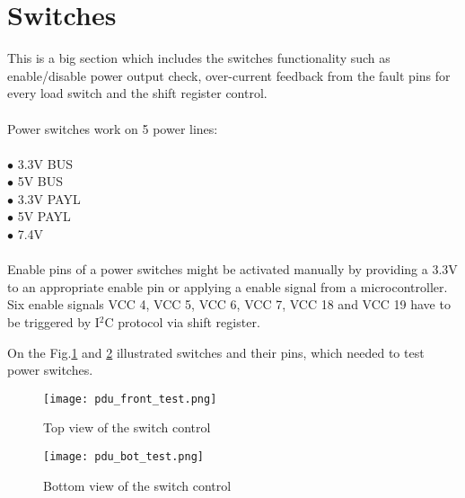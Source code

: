 \section{Switches}
This is a big section which includes the switches functionality such as enable/disable power output check, over-current feedback from the fault pins for every load switch  and the shift register control. \\
\\
Power switches work on 5 power lines:\\ \\
$\bullet$ 3.3V BUS\\
$\bullet$ 5V BUS\\
$\bullet$ 3.3V PAYL\\
$\bullet$ 5V PAYL\\
$\bullet$ 7.4V\\ \\
Enable pins of a power switches might be activated manually by providing a 3.3V to an appropriate enable pin or applying a enable signal from a microcontroller.  Six enable signals VCC 4, VCC 5, VCC 6, VCC 7, VCC 18 and VCC 19 have to be triggered by I$^2$C protocol via shift register.

On the Fig.\ref{fig: pdu_test_front}  and \ref{fig: pdu_test_back} illustrated switches and their pins, which needed to test power switches.



\begin{figure}[h]
	\centering
	\texttt{[image: pdu\_front\_test.png]}
	\caption{Top view of the switch control}
	\label{fig: pdu_test_front}
\end{figure} 

\begin{figure}[h]
	\centering
	\texttt{[image: pdu\_bot\_test.png]}
	\caption{Bottom view of the switch control}
	\label{fig: pdu_test_back}
\end{figure}

